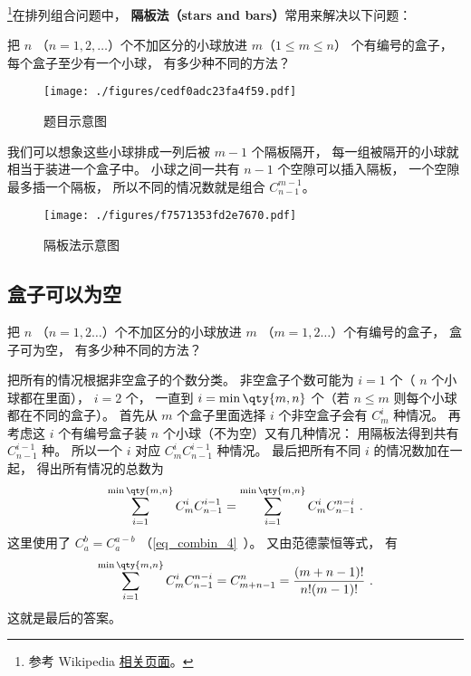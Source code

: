

\footnote{参考 Wikipedia \href{https://en.wikipedia.org/wiki/Stars_and_bars_(combinatorics)}{相关页面}。}在排列组合问题中， \textbf{隔板法（stars and bars）}常用来解决以下问题：

\begin{example}{}
把 $n$ （$n = 1,2,\dots$）个不加区分的小球放进 $m$（$1\leqslant m\leqslant n$） 个有编号的盒子， 每个盒子至少有一个小球， 有多少种不同的方法？
\begin{figure}[ht]
\centering
\texttt{[image: ./figures/cedf0adc23fa4f59.pdf]}
\caption{题目示意图} \label{fig_BarCom_1}
\end{figure}
\end{example}

我们可以想象这些小球排成一列后被 $m-1$ 个隔板隔开， 每一组被隔开的小球就相当于装进一个盒子中。 小球之间一共有 $n-1$ 个空隙可以插入隔板， 一个空隙最多插一个隔板， 所以不同的情况数就是组合 $C_{n-1}^{m-1}$。
\begin{figure}[ht]
\centering
\texttt{[image: ./figures/f7571353fd2e7670.pdf]}
\caption{隔板法示意图} \label{fig_BarCom_2}
\end{figure}

\subsection{盒子可以为空}


\begin{example}{}
把 $n$ （$n=1,2\dots$）个不加区分的小球放进 $m$ （$m=1,2\dots$）个有编号的盒子， 盒子可为空， 有多少种不同的方法？
\end{example}

把所有的情况根据非空盒子的个数分类。 非空盒子个数可能为 $i=1$ 个（ $n$ 个小球都在里面）， $i=2$ 个， 一直到 $i=\min\qty{m,n}$ 个（若 $n\leqslant m$ 则每个小球都在不同的盒子）。 首先从 $m$ 个盒子里面选择 $i$ 个非空盒子会有 $C_m^i$ 种情况。 再考虑这 $i$ 个有编号盒子装 $n$ 个小球（不为空）又有几种情况： 用隔板法得到共有 $C_{n-1}^{i-1}$ 种。 所以一个 $i$ 对应 $C_m^i C_{n-1}^{i-1}$ 种情况。 最后把所有不同 $i$ 的情况数加在一起， 得出所有情况的总数为
\begin{equation}
\sum_{i = 1}^{\min\qty{m,n}} C_m^i C_{n-1}^{i-1} = \sum_{i=1}^{\min\qty{m,n}}  C_m^i C_{n-1}^{n-i}~.
\end{equation}
这里使用了 $C_a^b = C_a^{a-b}$ （\autoref{eq_combin_4}~）。 又由范德蒙恒等式， 有
\begin{equation}
\sum_{i=1}^{\min\qty{m,n}}  C_m^i C_{n-1}^{n-i} = C_{m+n-1}^n = \frac{(m+n-1)!}{n!(m - 1)!}~.
\end{equation}
这就是最后的答案。
